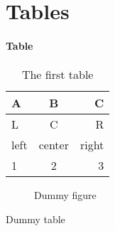 \documentclass{article}
\begin{document}
\section{Tables}
\paragraph{Table}
\begin{table}[h!]
  \begin{center}
		\begin{tabular}{| l | c | r |}
			\hline
			\textbf{A} & \textbf{B} & \textbf{C}\\
			\hline
			L & C & R\\
			left & center & right\\
			\hline
			1 & 2 & 3\\
			\hline
		\end{tabular}
		\caption{The first table}
		\label{table:table1}
  \end{center}
\end{table}

\begin{figure}
  \caption{Dummy figure}
\end{figure}

\begin{table}
  \caption{Dummy table}
\end{table}
\newpage

\begin{appendix}
  \listoffigures
  \listoftables
\end{appendix}
\end{document}
